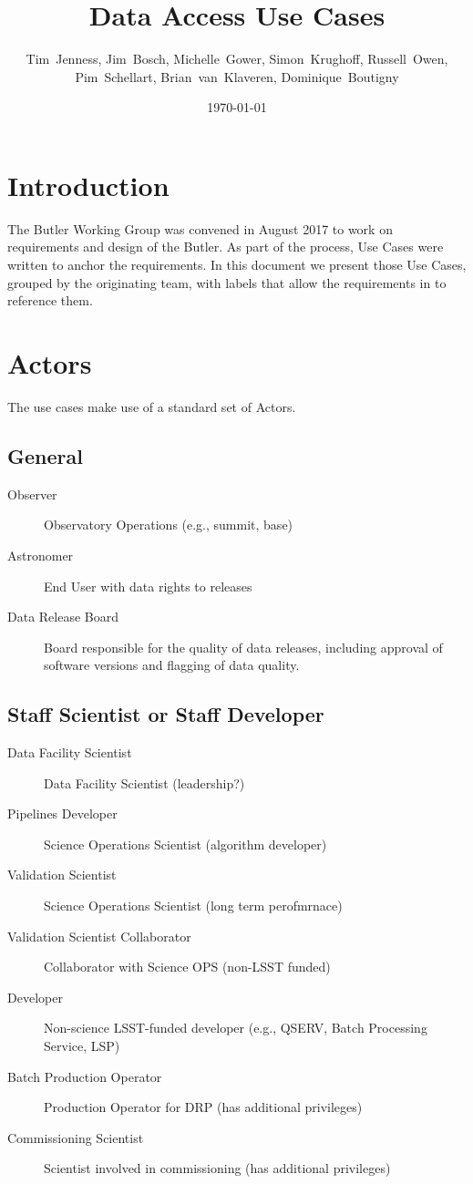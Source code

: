 \documentclass[DM,toc,lsstdraft]{lsstdoc}
\title{Data Access Use Cases}
\date{\today}
\author{Tim~Jenness, Jim~Bosch, Michelle~Gower, Simon~Krughoff,
Russell~Owen, Pim~Schellart, Brian~van~Klaveren, Dominique~Boutigny}
\begin{document}
%
%
\maketitle

\section{Introduction}

The Butler Working Group  was convened in August 2017 to work on requirements and design of the Butler.
As part of the process, Use Cases were written to anchor the requirements.
In this document we present those Use Cases, grouped by the originating team, with labels that allow the requirements in  to reference them.

\section{Actors}

The use cases make use of a standard set of Actors.

\subsection{General}

\begin{description}
\item[Observer] Observatory Operations (e.g., summit, base)
\item[Astronomer] End User with data rights to releases
\item[Data Release Board] Board responsible for the quality of data releases, including approval of software versions and flagging of data quality.
\end{description}

\subsection{Staff Scientist or Staff Developer}

\begin{description}
\item[Data Facility Scientist] Data Facility Scientist (leadership?)
\item[Pipelines Developer] Science Operations Scientist (algorithm developer)
\item[Validation Scientist] Science Operations Scientist (long term perofmrnace)
\item[Validation Scientist Collaborator] Collaborator with Science OPS (non-LSST funded)
\item[Developer] Non-science LSST-funded developer (e.g., QSERV, Batch Processing Service, LSP)
\item[Batch Production Operator] Production Operator for DRP (has additional privileges)
\item[Commissioning Scientist] Scientist involved in commissioning (has additional privileges)
\end{description}
\end{document}
